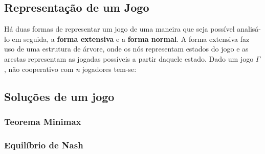 

\subsection{Representação de um Jogo}
\label{subsec:representacao-de-um-jogo}

Há duas formas de representar um jogo de uma maneira que seja possível analisá-lo em seguida, a \textbf{forma extensiva} e a \textbf{forma normal}. A forma extensiva faz uso de uma estrutura de árvore, onde os nós representam estados do jogo e as arestas representam as jogadas possíveis a partir daquele estado. Dado um jogo $\Gamma$, não cooperativo com \emph{n} jogadores tem-se:




\subsection{Soluções de um jogo}
\label{sec:solucoes-de-um-jogo}

\subsubsection{Teorema Minimax}
\label{subsubsec:teorema-minimax}

\subsubsection{Equilíbrio de Nash}
\label{subsubsec:equilibrio-de-nash}
